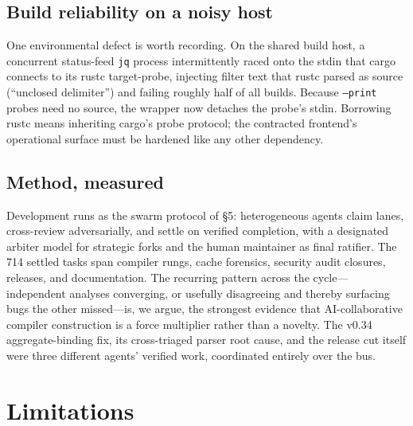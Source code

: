 \subsection{Build reliability on a noisy host}

One environmental defect is worth recording. On the shared build host, a concurrent status-feed \texttt{jq} process intermittently raced onto the stdin that cargo connects to its rustc target-probe, injecting filter text that rustc parsed as source (``unclosed delimiter'') and failing roughly half of all builds. Because \texttt{--print} probes need no source, the wrapper now detaches the probe's stdin. Borrowing rustc means inheriting cargo's probe protocol; the contracted frontend's operational surface must be hardened like any other dependency.

\subsection{Method, measured}

Development runs as the swarm protocol of \S5: heterogeneous agents claim lanes, cross-review adversarially, and settle on verified completion, with a designated arbiter model for strategic forks and the human maintainer as final ratifier. The 714 settled tasks span compiler rungs, cache forensics, security audit closures, releases, and documentation. The recurring pattern across the cycle---independent analyses converging, or usefully disagreeing and thereby surfacing bugs the other missed---is, we argue, the strongest evidence that AI-collaborative compiler construction is a force multiplier rather than a novelty. The v0.34 aggregate-binding fix, its cross-triaged parser root cause, and the release cut itself were three different agents' verified work, coordinated entirely over the bus.


\section{Limitations}

